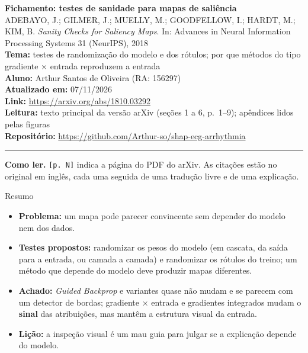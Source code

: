 \documentclass[11pt,a4paper]{article}
\begin{document}
\begin{center}
    {\LARGE \textbf{Fichamento: testes de sanidade para mapas de saliência}} \\[0.35em]
    {\large ADEBAYO, J.; GILMER, J.; MUELLY, M.; GOODFELLOW, I.; HARDT, M.; KIM, B. \textit{Sanity Checks for Saliency Maps}. In: Advances in Neural Information Processing Systems 31 (NeurIPS), 2018} \\[0.3em]
    \textbf{Tema:} testes de randomização do modelo e dos rótulos; por que métodos do tipo gradiente × entrada reproduzem a entrada \\[0.2em]
    \textbf{Aluno:} Arthur Santos de Oliveira (RA: 156297) \\[0.2em]
    \textbf{Atualizado em:} 07/11/2026 \\[0.2em]
    \textbf{Link:} \url{https://arxiv.org/abs/1810.03292} \\[0.2em]
    \textbf{Leitura:} texto principal da versão arXiv (seções 1 a 6, p.~1--9); apêndices lidos pelas figuras \\[0.2em]
    \textbf{Repositório:} \url{https://github.com/Arthur-so/shap-ecg-arrhythmia}
\end{center}
\vspace{-0.5em}
\hrule
\vspace{0.8em}

\textbf{Como ler.} \texttt{[p. N]} indica a página do PDF do arXiv. As citações estão no original em inglês, cada uma seguida de uma tradução livre e de uma explicação.

\begin{infobox}[note]{Resumo}
\begin{itemize}
\item \textbf{Problema:} um mapa pode parecer convincente sem depender do modelo nem dos dados.
\item \textbf{Testes propostos:} randomizar os pesos do modelo (em cascata, da saída para a entrada, ou camada a camada) e randomizar os rótulos do treino; um método que depende do modelo deve produzir mapas diferentes.
\item \textbf{Achado:} \textit{Guided Backprop} e variantes quase não mudam e se parecem com um detector de bordas; gradiente $\times$ entrada e gradientes integrados mudam o \textbf{sinal} das atribuições, mas mantêm a estrutura visual da entrada.
\item \textbf{Lição:} a inspeção visual é um mau guia para julgar se a explicação depende do modelo.
\end{itemize}
\end{infobox}
\end{document}
